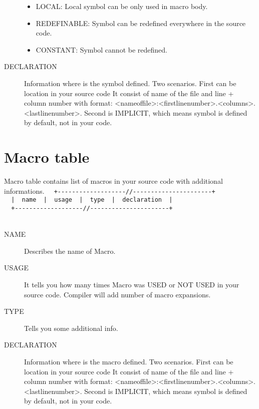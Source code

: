 \begin{description}
\begin{itemize}
                 \item LOCAL: Local symbol can be only used in macro body.
                 \item REDEFINABLE: Symbol can be redefined everywhere in the source code.
                 \item CONSTANT: Symbol cannot be redefined.
                \end{itemize}
             \item[DECLARATION] Information where is the symbol defined. Two scenarios. First can be location in your source code
             It consist of name of the file and line + column number with format: <nameoffile>:<firstlinenumber>.<columns>.<lastlinenumber>.
             Second is IMPLICIT, which means symbol is defined by default, not in your code.
            \end{description}

        \section{Macro table}
            Macro table contains list of macros in your source code with additional informations.
            {
                \usecodefont
                \verb'  +-------------------//----------------------+'\\
                \verb'  |  name  |  usage  |  type  |  declaration  |'\\
                \verb'  +-------------------//----------------------+'\\
            }\\
            \begin{description}
             \item[NAME] Describes the name of Macro.
             \item[USAGE] It tells you how many times Macro was USED or NOT USED in your source code. Compiler will add number of macro expansions.
             \item[TYPE] Tells you some additional info.
             \item[DECLARATION] Information where is the macro defined. Two scenarios. First can be location in your source code
             It consist of name of the file and line + column number with format: <nameoffile>:<firstlinenumber>.<columns>.<lastlinenumber>.
             Second is IMPLICIT, which means symbol is defined by default, not in your code.
            \end{description}

